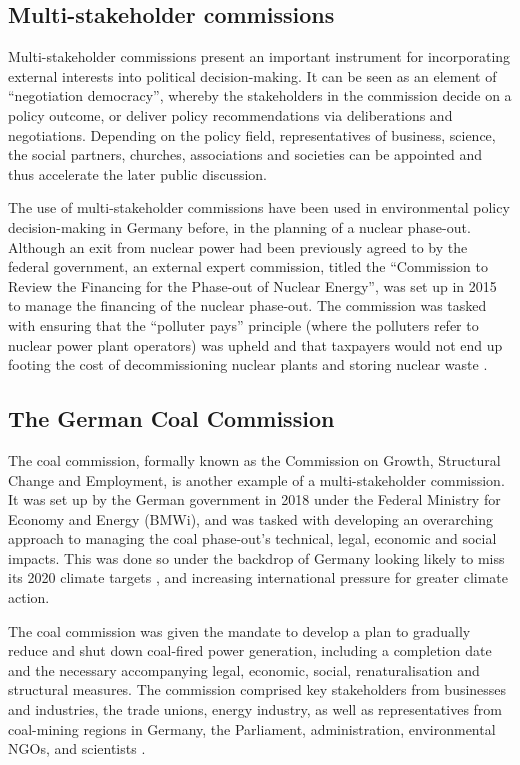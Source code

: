 \documentclass[12pt,onecolumn,twoside]{layout}
\begin{document}
\subsection*{Multi-stakeholder commissions}
Multi-stakeholder commissions present an important instrument for incorporating external interests into political decision-making. It can be seen as an element of ``negotiation democracy'', whereby the stakeholders in the commission decide on a policy outcome, or deliver policy recommendations via deliberations and negotiations. Depending on the policy field, representatives of business, science, the social partners, churches, associations and societies can be appointed and thus accelerate the later public discussion. \cite{Siefken2016}

The use of multi-stakeholder commissions have been used in environmental policy decision-making in Germany before, in the planning of a nuclear phase-out. Although an exit from nuclear power had been previously agreed to by the federal government, an external expert commission, titled the ``Commission to Review the Financing for the Phase-out of Nuclear Energy'', was set up in 2015 to manage the financing of the nuclear phase-out. The commission was tasked with ensuring that the ``polluter pays'' principle (where the polluters refer to nuclear power plant operators) was upheld and that taxpayers would not end up footing the cost of decommissioning nuclear plants and storing nuclear waste \cite{Appunn2017}. 

\subsection*{The German Coal Commission}
The coal commission, formally known as the Commission on Growth, Structural Change and Employment, is another example of a multi-stakeholder commission. It was set up by the German government in 2018 under the Federal Ministry for Economy and Energy (BMWi), and was tasked with developing an overarching approach to managing the coal phase-out’s technical, legal, economic and social impacts. This was done so under the backdrop of Germany looking likely to miss its 2020 climate targets \cite{der2017projektionsbericht}, and increasing international pressure for greater climate action. 

The coal commission was given the mandate to develop a plan to gradually reduce and shut down coal-fired power generation, including a completion date and the necessary accompanying legal, economic, social, renaturalisation and structural measures. \cite{Groll2019} The commission comprised key stakeholders from businesses and industries, the trade unions, energy industry, as well as representatives from coal-mining regions in Germany, the Parliament, administration, environmental NGOs, and scientists \cite{AgoraEnergiewende2019}. 
\end{document}

